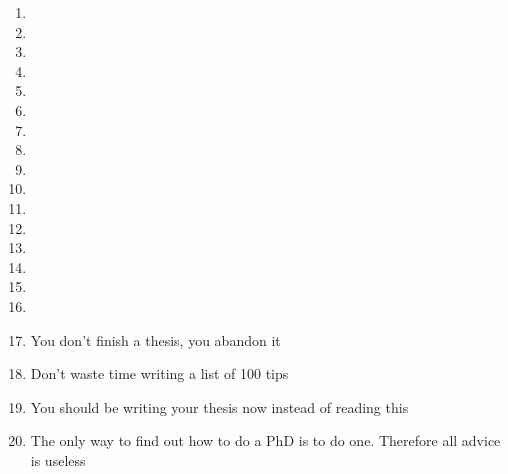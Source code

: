 \begin{enumerate}
	\item
	\item
	\item
	\item
	\item
	\item
	\item
	\item
	\item
	\item
	\item
	\item
	\item
	\item
	\item
	\item
	\item You don't finish a thesis, you abandon it 
	\item Don't waste time writing a list of 100 tips
	\item You should be writing your thesis now instead of reading this
	\item The only way to find out how to do a PhD is to do one. Therefore all advice is useless\cite{richardbutterworth}
\end{enumerate}








\
